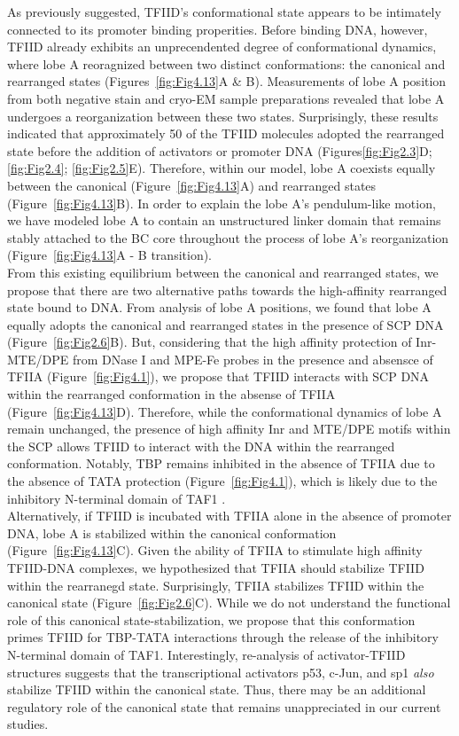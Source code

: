 As previously suggested, TFIID's conformational state appears to be intimately connected to its promoter binding properities. Before binding DNA, however, TFIID already exhibits an unprecendented degree of conformational dynamics, where lobe A reoragnized between two distinct conformations: the canonical and rearranged states (Figures~\ref{fig:Fig4.13}A \& B). Measurements of lobe A position from both negative stain and cryo-EM sample preparations revealed that lobe A undergoes a reorganization between these two states. Surprisingly, these results indicated that approximately 50 of the TFIID molecules adopted the rearranged state before the addition of activators or promoter DNA  (Figures\ref{fig:Fig2.3}D; \ref{fig:Fig2.4}; \ref{fig:Fig2.5}E). Therefore, within our model, lobe A coexists equally between the canonical (Figure~\ref{fig:Fig4.13}A) and rearranged states (Figure~\ref{fig:Fig4.13}B). In order to explain the lobe A's pendulum-like motion, we have modeled lobe A to contain an unstructured linker domain that remains stably attached to the BC core throughout the process of lobe A's reorganization (Figure~\ref{fig:Fig4.13}A - B transition). \\
\indent From this existing equilibrium between the canonical and rearranged states, we propose that there are two alternative paths towards the high-affinity rearranged state bound to DNA. From analysis of lobe A positions, we found that lobe A equally adopts the canonical and rearranged states in the presence of SCP DNA (Figure~\ref{fig:Fig2.6}B). But, considering that the high affinity protection of Inr-MTE/DPE from DNase I and MPE-Fe probes in the presence and absensce of TFIIA (Figure~\ref{fig:Fig4.1}), we propose that TFIID interacts with SCP DNA within the rearranged conformation in the absense of TFIIA (Figure~\ref{fig:Fig4.13}D). Therefore, while the conformational dynamics of lobe A remain unchanged, the presence of high affinity Inr and MTE/DPE motifs within the SCP allows TFIID to interact with the DNA within the rearranged conformation.  Notably, TBP remains inhibited in the absence of TFIIA due to the absence of TATA protection (Figure~\ref{fig:Fig4.1}), which is likely due to the inhibitory N-terminal domain of TAF1 \cite{Bagby_2202,Geiger_2949,Liu_2574}. \\
\indent Alternatively, if TFIID is incubated with TFIIA alone in the absence of promoter DNA, lobe A is stabilized within the canonical conformation (Figure~\ref{fig:Fig4.13}C). Given the ability of TFIIA to stimulate high affinity TFIID-DNA complexes, we hypothesized that TFIIA should stabilize TFIID within the rearranegd state. Surprisingly, TFIIA stabilizes TFIID within the canonical state (Figure~\ref{fig:Fig2.6}C). While we do not understand the functional role of this canonical state-stabilization, we propose that this conformation primes TFIID for TBP-TATA interactions through the release of the inhibitory N-terminal domain of TAF1. Interestingly, re-analysis of activator-TFIID structures suggests that the transcriptional activators p53, c-Jun, and sp1 \emph{also} stabilize TFIID within the canonical state. Thus, there may be an additional regulatory role of the canonical state that remains unappreciated in our current studies.\\
